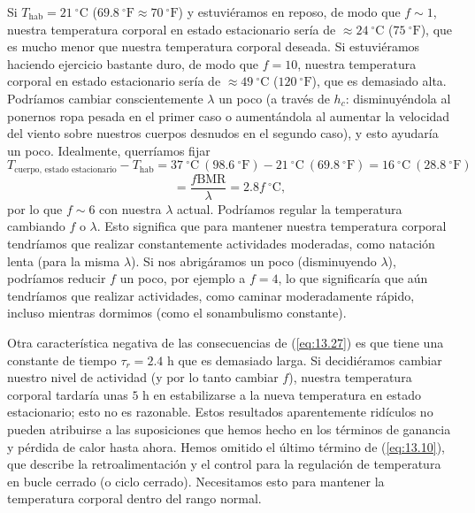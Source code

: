 \documentclass[12pt]{book}
\begin{document}
Si $T_{\text{hab}} = 21\ ^\circ\text{C}$ ($69.8\ ^\circ\text{F} \approx 70\ ^\circ\text{F}$) y estuviéramos en reposo, de modo que $f \sim 1$, nuestra temperatura corporal en estado estacionario sería de $\approx 24\ ^\circ\text{C}$ ($75\ ^\circ\text{F}$), que es mucho menor que nuestra temperatura corporal deseada. Si estuviéramos haciendo ejercicio bastante duro, de modo que $f = 10$, nuestra temperatura corporal en estado estacionario sería de $\approx 49\ ^\circ\text{C}$ ($120\ ^\circ\text{F}$), que es demasiado alta. Podríamos cambiar conscientemente $\lambda$ un poco (a través de $h_c$: disminuyéndola al ponernos ropa pesada en el primer caso o aumentándola al aumentar la velocidad del viento sobre nuestros cuerpos desnudos en el segundo caso), y esto ayudaría un poco. Idealmente, querríamos fijar
\begin{equation}
  T_{\text{cuerpo, estado estacionario}} - T_{\text{hab}} = 37\ ^\circ\text{C}\ (98.6\ ^\circ\text{F}) - 21\ ^\circ\text{C}\ (69.8\ ^\circ\text{F}) = 16\ ^\circ\text{C}\ (28.8\ ^\circ\text{F}) \label{eq:13.29}
\end{equation}
\begin{equation}
  = \frac{f \text{BMR}}{\lambda} = 2.8 f\ ^\circ\text{C}, \label{eq:13.30}
\end{equation}
por lo que $f \sim 6$ con nuestra $\lambda$ actual. Podríamos regular la temperatura cambiando $f$ o $\lambda$. Esto significa que para mantener nuestra temperatura corporal tendríamos que realizar constantemente actividades moderadas, como natación lenta (para la misma $\lambda$). Si nos abrigáramos un poco (disminuyendo $\lambda$), podríamos reducir $f$ un poco, por ejemplo a $f = 4$, lo que significaría que aún tendríamos que realizar actividades, como caminar moderadamente rápido, incluso mientras dormimos (como el sonambulismo constante).

Otra característica negativa de las consecuencias de (\ref{eq:13.27}) es que tiene una constante de tiempo $\tau_r = 2.4\text{ h}$ que es demasiado larga. Si decidiéramos cambiar nuestro nivel de actividad (y por lo tanto cambiar $f$), nuestra temperatura corporal tardaría unas $5\text{ h}$ en estabilizarse a la nueva temperatura en estado estacionario; esto no es razonable. Estos resultados aparentemente ridículos no pueden atribuirse a las suposiciones que hemos hecho en los términos de ganancia y pérdida de calor hasta ahora. Hemos omitido el último término de (\ref{eq:13.10}), que describe la retroalimentación y el control para la regulación de temperatura en bucle cerrado (o ciclo cerrado). Necesitamos esto para mantener la temperatura corporal dentro del rango normal.
\end{document}
